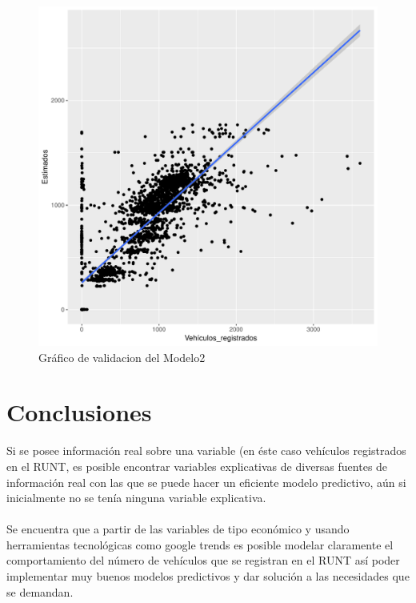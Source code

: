 \documentclass[11pt,twoside]{article}
\begin{document}
\begin{figure}[H]
	\centering
	\includegraphics{chicharra33.pdf}
	\caption{Gráfico de  validacion del Modelo2}
\end{figure}
 
\section{Conclusiones}
\noindent
Si se posee información real sobre una variable (en éste caso vehículos registrados en el RUNT, es posible encontrar variables explicativas de diversas fuentes de información real con las que se puede hacer un eficiente modelo predictivo, aún si inicialmente no se tenía ninguna variable explicativa.
\\
\\
Se encuentra que a partir de las variables de tipo económico y usando herramientas tecnológicas como google trends es posible modelar claramente el comportamiento del número de vehículos que se registran en el RUNT así poder implementar muy buenos modelos predictivos y dar solución a las necesidades que se demandan.





\end{document}
